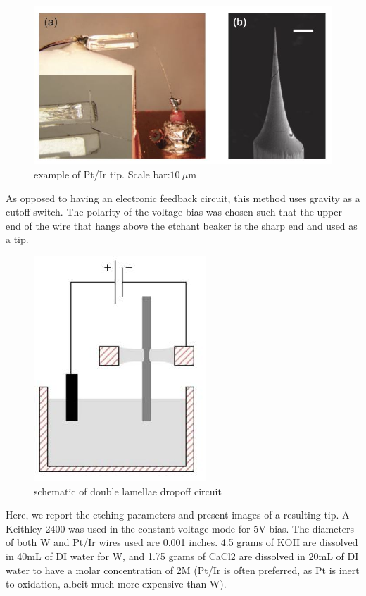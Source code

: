 \documentclass[11pt]{article}
\numberwithin{equation}{section}
\begin{document}
\begin{figure}
	\centering
	\includegraphics[scale=0.6] {shentip.jpg}
	\caption{example of Pt/Ir tip. Scale bar:\( 10\ \mu \)m}
	\label{shentip}
\end{figure}

As opposed to having an electronic feedback circuit, this method uses gravity as a cutoff switch. The polarity of the voltage bias was chosen such that the upper end of the wire that hangs above the etchant beaker is the sharp end and used as a tip.  \\

\begin{figure}
	\centering
	\includegraphics[scale=0.7] {doublelacircuit.jpg}
	\caption{schematic of double lamellae dropoff circuit \cite{doublelacircuit}}
	\label{doublelacircuit}
\end{figure}


Here, we report the etching parameters and present images of a resulting tip.  A Keithley 2400 was used in the constant voltage mode for 5V bias.  The diameters of both W and Pt/Ir wires used are 0.001 inches. 4.5 grams of KOH are dissolved in 40mL of DI water for W, and 1.75 grams of CaCl2 are dissolved in 20mL of DI water to have a molar concentration of 2M (Pt/Ir is often preferred, as Pt is inert to oxidation, albeit much more expensive than W).\\
\end{document}
